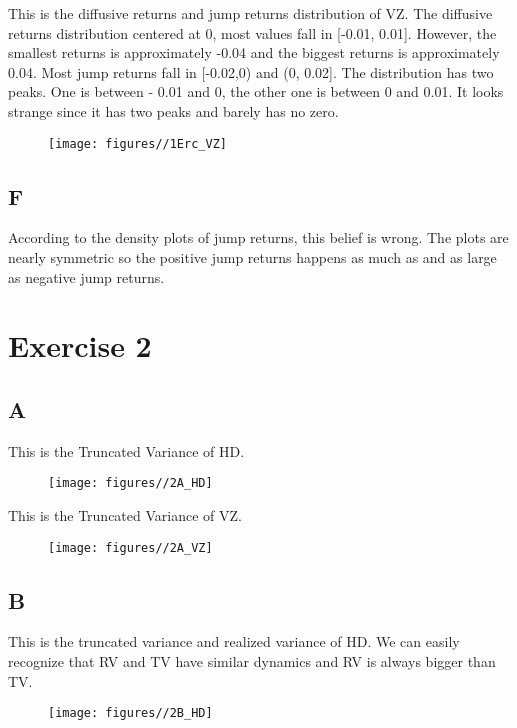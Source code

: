 \documentclass{report}
\begin{document}
This is the diffusive returns and jump returns distribution of VZ. The diffusive returns distribution centered at 0, most values fall in [-0.01, 0.01]. However, the smallest returns is approximately -0.04 and the biggest returns is approximately 0.04. Most jump returns fall in [-0.02,0) and (0, 0.02]. The distribution has two peaks. One is between - 0.01 and 0, the other one is between 0 and 0.01.  It looks strange since it has two peaks and barely has no zero.
\begin{figure}[H]
        \centering 
         \texttt{[image: figures//1Erc\_VZ]}
\end{figure}


\subsection{F}
According to the density plots of jump returns, this belief is wrong. The plots are nearly symmetric so the positive jump returns happens as much as and as large as negative jump returns.

\section{ Exercise 2}

\subsection{A}
This is the Truncated Variance of HD.
\begin{figure}[H]
        \centering 
         \texttt{[image: figures//2A\_HD]}
\end{figure}

This is the Truncated Variance of VZ.
\begin{figure}[H]
        \centering 
         \texttt{[image: figures//2A\_VZ]}
\end{figure}

\subsection{B}
This is the truncated variance and realized variance of HD. We can easily recognize that RV and TV have similar dynamics and RV is always bigger than TV.
\begin{figure}[H]
        \centering 
         \texttt{[image: figures//2B\_HD]}
\end{figure}
\end{document}

